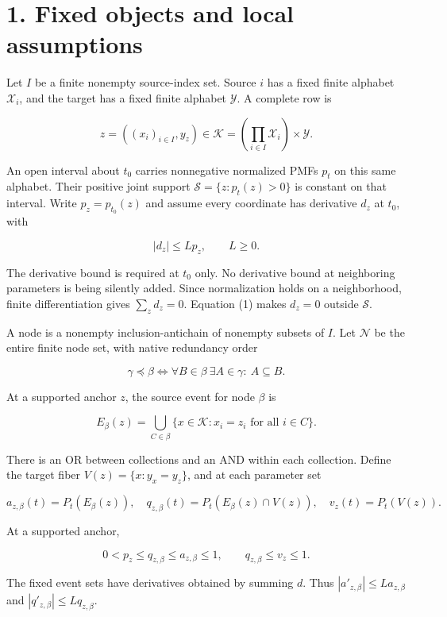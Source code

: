 \documentclass[11pt,a4paper]{article}
\newcounter{none}
\begin{document}
\section{1. Fixed objects and local assumptions}\label{fixed-objects-and-local-assumptions}

Let \(I\) be a finite nonempty source-index set. Source \(i\) has a fixed finite alphabet \(\mathcal X_i\), and the target has a fixed finite alphabet \(\mathcal Y\). A complete row is

\[
z=((x_i)_{i\in I},y_z)\in\mathcal K
=\left(\prod_{i\in I}\mathcal X_i\right)\times\mathcal Y.
\]

An open interval about \(t_0\) carries nonnegative normalized PMFs \(p_t\) on this same alphabet. Their positive joint support \(\mathcal S=\{z:p_t(z)>0\}\) is constant on that interval. Write \(p_z=p_{t_0}(z)\) and assume every coordinate has derivative \(d_z\) at \(t_0\), with

\[
|d_z|\le Lp_z,\qquad L\ge0. \tag{1}
\]

The derivative bound is required at \(t_0\) only. No derivative bound at neighboring parameters is being silently added. Since normalization holds on a neighborhood, finite differentiation gives \(\sum_zd_z=0\). Equation (1) makes \(d_z=0\) outside \(\mathcal S\).

A node is a nonempty inclusion-antichain of nonempty subsets of \(I\). Let \(\mathcal N\) be the entire finite node set, with native redundancy order

\[
\gamma\preceq\beta
\iff\forall B\in\beta\ \exists A\in\gamma:\ A\subseteq B.
\]

At a supported anchor \(z\), the source event for node \(\beta\) is

\[
E_\beta(z)=\bigcup_{C\in\beta}
 \{x\in\mathcal K:x_i=z_i\text{ for all }i\in C\}.
\]

There is an OR between collections and an AND within each collection. Define the target fiber \(V(z)=\{x:y_x=y_z\}\), and at each parameter set

\[
a_{z,\beta}(t)=P_t(E_\beta(z)),\quad
q_{z,\beta}(t)=P_t(E_\beta(z)\cap V(z)),\quad
v_z(t)=P_t(V(z)).
\]

At a supported anchor,

\[
0<p_z\le q_{z,\beta}\le a_{z,\beta}\le1,
\qquad q_{z,\beta}\le v_z\le1. \tag{2}
\]

The fixed event sets have derivatives obtained by summing \(d\). Thus \(|a'_{z,\beta}|\le La_{z,\beta}\) and \(|q'_{z,\beta}|\le Lq_{z,\beta}\).
\end{document}
